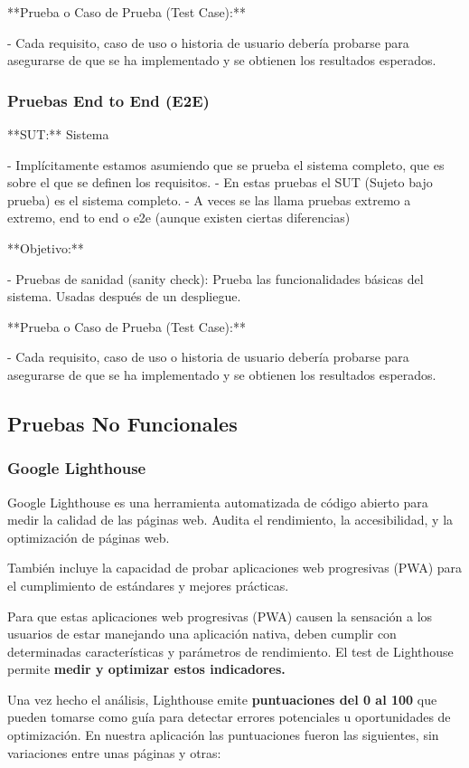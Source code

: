 \documentclass[12pt,twoside,titlepage]{report}
\begin{document}
**Prueba o Caso de Prueba (Test Case):**

- Cada requisito, caso de uso o historia de usuario debería probarse para asegurarse de que se ha implementado y se obtienen los resultados esperados.

\subsubsection{Pruebas End to End (E2E)}

**SUT:** Sistema 

- Implícitamente estamos asumiendo que se prueba el sistema completo, que es sobre el que se definen los requisitos.
- En estas pruebas el SUT (Sujeto bajo prueba) es el sistema completo.
- A veces se las llama pruebas extremo a extremo, end to end o e2e (aunque existen ciertas diferencias)

**Objetivo:**

- Pruebas de sanidad (sanity check): Prueba las funcionalidades básicas del sistema. Usadas después de un despliegue.

**Prueba o Caso de Prueba (Test Case):**

- Cada requisito, caso de uso o historia de usuario debería probarse para asegurarse de que se ha implementado y se obtienen los resultados esperados.

\subsection{Pruebas No Funcionales}

\subsubsection{Google Lighthouse}

Google Lighthouse es una herramienta automatizada de código abierto para medir la calidad de las páginas web. Audita el rendimiento, la accesibilidad, y la optimización de páginas web.

También incluye la capacidad de probar aplicaciones web progresivas (PWA) para el cumplimiento de estándares y mejores prácticas.

Para que estas aplicaciones web progresivas (PWA) causen la sensación a los usuarios de estar manejando una aplicación nativa, deben cumplir con determinadas características y parámetros de rendimiento. El test de Lighthouse permite \textbf{medir y optimizar estos indicadores.}

Una vez hecho el análisis, Lighthouse emite \textbf{puntuaciones del 0 al 100} que pueden tomarse como guía para detectar errores potenciales u oportunidades de optimización. En nuestra aplicación las puntuaciones fueron las siguientes, sin variaciones entre unas páginas y otras:
\end{document}

